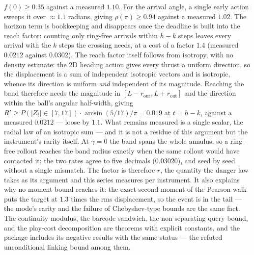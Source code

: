 \documentclass[11pt]{article}
\theoremstyle{remark}
\begin{document}
$f(0) \ge 0.35$ against a measured $1.10$. For the arrival angle, a single
early action sweeps it over ${\approx}1.1$ radians, giving
$\rho(\pi) \ge 0.94$ against a measured $1.02$. The horizon term is bookkeeping and disappears once the deadline is built
into the reach factor: counting only ring-free arrivals within $h - k$
steps leaves every arrival with the $k$ steps the crossing needs, at a cost
of a factor $1.4$ (measured $0.0212$ against $0.0302$). The reach factor
itself follows from isotropy, with no density estimate: the $2$D heading
action gives every thrust a uniform direction, so the displacement is a sum
of independent isotropic vectors and is isotropic, whence its direction is
uniform \emph{and} independent of its magnitude. Reaching the band
therefore needs the magnitude in $[L - r_{\mathrm{out}}, L +
r_{\mathrm{out}}]$ and the direction within the ball's angular half-width,
giving $R' \ge P(|Z_t| \in [7,17]) \cdot \arcsin(5/17)/\pi = 0.019$ at
$t = h-k$, against a measured $0.0212$ --- loose by $1.1$. What remains
measured is a single scalar, the radial law of an isotropic sum --- and it
is not a residue of this argument but the instrument's rarity itself. At
$\gamma = 0$ the band spans the whole annulus, so a ring-free rollout
reaches the band radius exactly when the same rollout would have contacted
it: the two rates agree to five decimals ($0.03020$), and seed by seed
without a single mismatch. The factor is therefore $r$, the quantity the
danger law takes as its argument and this series measures per instrument.
It also explains why no moment bound reaches it: the exact second moment of
the Pearson walk puts the target at $1.3$ times the rms displacement, so
the event is in the tail --- the mode's rarity and the failure of
Chebyshev-type bounds are the same fact. The continuity modulus, the
barcode sandwich, the
non-separating query bound, and the play-cost decomposition are
theorems with explicit constants, and the package includes its negative
results with the same status --- the refuted unconditional linking
bound among them.
\end{document}
